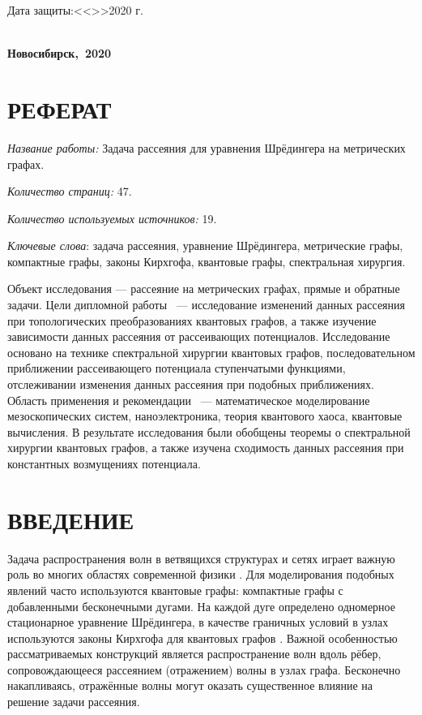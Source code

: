 \documentclass[a4 paper, 12 pt]{extarticle}
\begin{document}
	\hfill \break
	\begin{flushright}
		\large{Дата защиты:\large{<<\makebox[1cm]{\hrulefill}>>\makebox[4cm]{\hrulefill}2020 г.}}
	\end{flushright}
	
	\hfill \break
	\begin{singlespacing}
		\begin{center}
			\large{\textbf{\\Новосибирск,~2020}}
		\end{center} 
	\end{singlespacing}

	\section*{РЕФЕРАТ}
	{\it Название работы:} Задача рассеяния для уравнения Шрёдингера на метрических графах.
	
	{\it Количество страниц:} 47.
	
	{\it Количество используемых источников:} 19.
	
	{\it Ключевые слова}: задача рассеяния, уравнение Шрёдингера, метрические графы, компактные графы, законы Кирхгофа, квантовые графы, спектральная хирургия.
	
	Объект исследования --- рассеяние на метрических графах, прямые и обратные задачи. Цели дипломной работы ~--- исследование изменений данных рассеяния при топологических преобразованиях квантовых графов, а также изучение зависимости данных рассеяния от рассеивающих потенциалов. 	Исследование основано на технике спектральной хирургии квантовых графов, последовательном приближении рассеивающего потенциала ступенчатыми функциями, отслеживании изменения данных рассеяния при подобных приближениях. Область применения и рекомендации ~--- математическое моделирование мезоскопических систем, наноэлектроника, теория квантового хаоса, квантовые вычисления. В результате исследования были обобщены теоремы о спектральной хирургии квантовых графов, а также изучена сходимость данных рассеяния при константных возмущениях потенциала.
	
	\newpage
	\tableofcontents
	\newpage
	\section*{ВВЕДЕНИЕ}
	Задача распространения волн в ветвящихся структурах и сетях играет важную роль во многих областях современной физики \cite{TransparentQuantumGraphs}. Для моделирования подобных явлений часто используются квантовые графы: компактные графы с добавленными бесконечными дугами. На каждой дуге определено одномерное стационарное уравнение Шрёдингера, в качестве граничных условий в узлах используются законы Кирхгофа для квантовых графов \cite{KirchhoffRule}. Важной особенностью рассматриваемых конструкций является распространение волн вдоль рёбер, сопровождающееся рассеянием (отражением)  волны в узлах графа. Бесконечно накапливаясь, отражённые волны могут оказать существенное влияние на решение задачи рассеяния.
	
\end{document}
